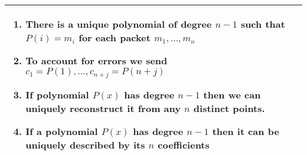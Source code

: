 {\tabulinesep=1mm
\begin{tabu}{|p{16cm} |}
\hline
\begin{enumerate} 
\item There is a unique polynomial of degree $n-1$ such that $P(i) = m_i$ 
for each packet $ m_1, \dotsc, m_n$
\item To account for errors we send $c_1=P(1), \dotsc, c_{n+j}=P(n+j)$
\item If polynomial $P(x)$ has degree $n - 1$ then we can uniquely 
reconstruct it from any $n$ distinct points. 
\item If a polynomial $P(x)$ has degree $n - 1$ then it can be uniquely 
described by its $n$ coefficients 
\end{enumerate}\\
\hline
\end{tabu}
}
